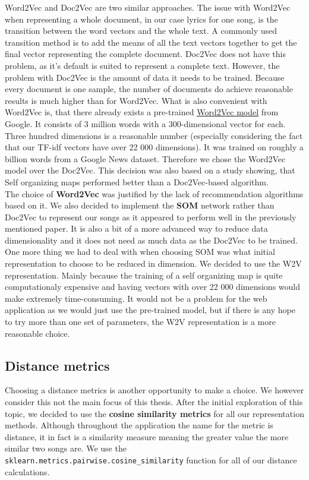 Word2Vec and Doc2Vec are two similar approaches. The issue with Word2Vec when representing a whole document, in our case lyrics for one song, is the transition between the word vectors and the whole text. A commonly used transition method is to add the means of all the text vectors together to get the final vector representing the complete document. Doc2Vec does not have this problem, as it's default is suited to represent a complete text. However, the problem with Doc2Vec is the amount of data it needs to be trained. Because every document is one sample, the number of documents do achieve reasonable results is much higher than for Word2Vec. What is also convenient with Word2Vec is, that there already exists a pre-trained \underline{\color{blue}\href{https://code.google.com/archive/p/word2vec/}{Word2Vec model}} from Google. It consists of 3 million words with a 300-dimensional vector for each. Three hundred dimensions is a reasonable number (especially considering the fact that our TF-idf vectors have over 22 000 dimensions). It was trained on roughly a billion words from a Google News dataset. Therefore we chose the Word2Vec model over the Doc2Vec. This decision was also based on a study \cite{inproceedings} showing, that Self organizing maps performed better than a Doc2Vec-based algorithm. \\

The choice of \textbf{Word2Vec} was justified by the lack of recommendation algorithms based on it. We also decided to implement the \textbf{SOM} network rather than Doc2Vec to represent our songs as it appeared to perform well in the previously mentioned paper. It is also a bit of a more advanced way to reduce data dimensionality and it does not need as much data as the Doc2Vec to be trained. One more thing we had to deal with when choosing SOM was what initial representation to choose to be reduced in dimension. We decided to use the W2V representation. Mainly because the training of a self organizing map is quite computationaly expensive and having vectors with over 22 000 dimensions would make extremely time-consuming. It would not be a problem for the web application as we would just use the pre-trained model, but if there is any hope to try more than one set of parameters, the W2V representation is a more reasonable choice.


\subsection{Distance metrics}
Choosing a distance metrics is another opportunity to make a choice. We however consider this not the main focus of this thesis. After the initial exploration of this topic, we decided to use the \textbf{cosine similarity metrics} for all our representation methods. Although throughout the application the name for the metric is distance, it in fact is a similarity measure meaning the greater value the more similar two songs are. We use the \texttt{sklearn.metrics.pairwise.cosine\_similarity} function for all of our distance calculations.